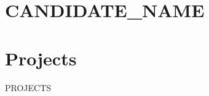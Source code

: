 \documentclass[11pt]{article}
\begin{document}
\section*{{{CANDIDATE_NAME}}}

\section*{Projects}

{{PROJECTS}}
\end{document}
